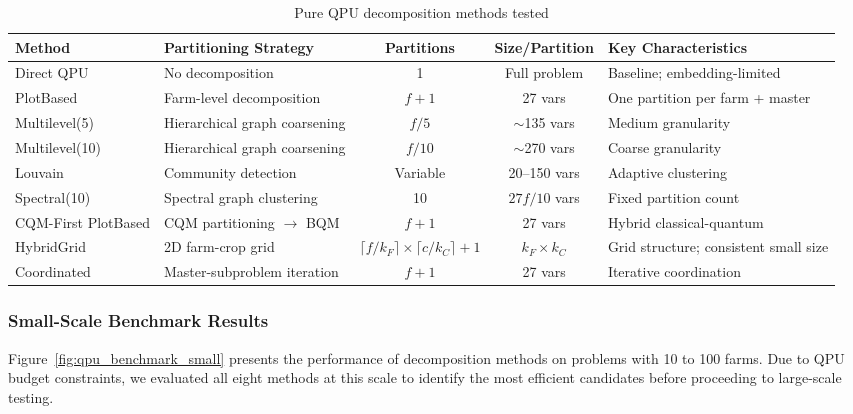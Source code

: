 \begin{table}[H]
\centering
\caption{Pure QPU decomposition methods tested}
\label{tab:decomposition_methods}
\begin{adjustbox}{max width=\textwidth}
\small
\begin{tabular}{llccp{5cm}}
\toprule
\textbf{Method} & \textbf{Partitioning Strategy} & \textbf{Partitions} & \textbf{Size/Partition} & \textbf{Key Characteristics} \\
\midrule
Direct QPU & No decomposition & 1 & Full problem & Baseline; embedding-limited \\

PlotBased & Farm-level decomposition & $f + 1$ & 27 vars & One partition per farm + master \\

Multilevel(5) & Hierarchical graph coarsening & $f/5$ & $\sim$135 vars & Medium granularity \\

Multilevel(10) & Hierarchical graph coarsening & $f/10$ & $\sim$270 vars & Coarse granularity \\

Louvain & Community detection & Variable & 20--150 vars & Adaptive clustering \\

Spectral(10) & Spectral graph clustering & 10 & $27f/10$ vars & Fixed partition count \\

CQM-First PlotBased & CQM partitioning $\to$ BQM & $f + 1$ & 27 vars & Hybrid classical-quantum \\

HybridGrid & 2D farm-crop grid & $\lceil f/k_F \rceil \times \lceil c/k_C \rceil + 1$ & $k_F \times k_C$ & Grid structure; consistent small size \\

Coordinated & Master-subproblem iteration & $f + 1$ & 27 vars & Iterative coordination \\
\bottomrule
\end{tabular}
\end{adjustbox}
\end{table}

\subsubsection{Small-Scale Benchmark Results}

Figure~\ref{fig:qpu_benchmark_small} presents the performance of decomposition methods on problems with 10 to 100 farms. Due to QPU budget constraints, we evaluated all eight methods at this scale to identify the most efficient candidates before proceeding to large-scale testing.

